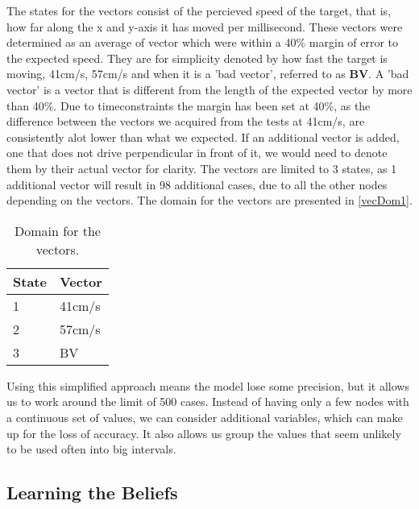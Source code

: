 The states for the vectors consist of the percieved speed of the target, that
is, how far along the x and y-axis it has moved per millisecond. These vectors
were determined as an average of vector which were within a 40\% margin of
error to the expected speed. They are for simplicity denoted by how fast
the target is moving, 41cm/s, 57cm/s and when it is a 'bad vector', referred to
as \textbf{BV}. A 'bad vector' is a vector that is different from the length of
the expected vector by more than 40\%. Due to timeconstraints the margin has
been set at 40\%, as the difference between the vectors we acquired from the
tests at 41cm/s, are consistently alot lower than what we expected. If an
additional vector is added, one that does not drive perpendicular in front of
it, we would need to denote them by their actual vector for clarity. The
vectors are limited to 3 states, as 1 additional vector will result in 98
additional cases, due to all the other nodes depending on the vectors. The
domain for the vectors are presented in \autoref{vecDom1}.

\begin{table}[H]
\centering
\begin{tabular}{l|l}
State & Vector \\ \hline
1     & 41cm/s \\
2     & 57cm/s \\
3     & BV
\end{tabular}
\caption{Domain for the vectors.}
\label{vecDom1}
\end{table}

Using this simplified approach means the model lose some precision, but it
allows us to work around the limit of 500 cases. Instead of having only a few
nodes with a continuous set of values, we can consider additional variables,
which can make up for the loss of accuracy. It also allows us group the values
that seem unlikely to be used often into big intervals.

\subsection{Learning the Beliefs}

